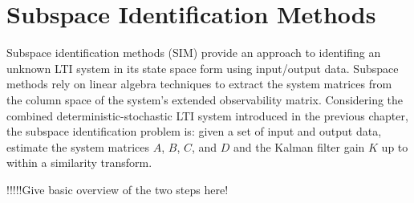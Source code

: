 \chapter{Subspace Identification Methods}
Subspace identification methods (SIM) provide an approach to identifing an unknown LTI system in its state space form using input/output data. Subspace methods rely on linear algebra techniques to extract the system matrices from the column space of the system's extended observability matrix. Considering the combined deterministic-stochastic LTI system introduced in the previous chapter, the subspace identification problem is: given a set of input and output data, estimate the system matrices $A$, $B$, $C$, and $D$ and the Kalman filter gain $K$ up to within a similarity transform. 

!!!!!Give basic overview of the two steps here!


